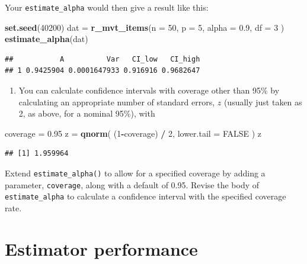 \documentclass[
]{book}
\newenvironment{Shaded}{\begin{snugshade}}{\end{snugshade}}
\newcommand{\AttributeTok}[1]{\textcolor[rgb]{0.13,0.29,0.53}{#1}}
\newcommand{\ConstantTok}[1]{\textcolor[rgb]{0.56,0.35,0.01}{#1}}
\newcommand{\DecValTok}[1]{\textcolor[rgb]{0.00,0.00,0.81}{#1}}
\newcommand{\FloatTok}[1]{\textcolor[rgb]{0.00,0.00,0.81}{#1}}
\newcommand{\FunctionTok}[1]{\textcolor[rgb]{0.13,0.29,0.53}{\textbf{#1}}}
\newcommand{\NormalTok}[1]{#1}
\newcommand{\OtherTok}[1]{\textcolor[rgb]{0.56,0.35,0.01}{#1}}
\newcommand{\SpecialCharTok}[1]{\textcolor[rgb]{0.81,0.36,0.00}{\textbf{#1}}}
\providecommand{\tightlist}{%
  \setlength{\itemsep}{0pt}\setlength{\parskip}{0pt}}
\begin{document}
Your \texttt{estimate\_alpha} would then give a result like this:

\begin{Shaded}
\begin{Highlighting}[]
\FunctionTok{set.seed}\NormalTok{(}\DecValTok{40200}\NormalTok{)}
\NormalTok{dat }\OtherTok{=} \FunctionTok{r\_mvt\_items}\NormalTok{(}\AttributeTok{n =} \DecValTok{50}\NormalTok{, }\AttributeTok{p =} \DecValTok{5}\NormalTok{, }\AttributeTok{alpha =} \FloatTok{0.9}\NormalTok{, }\AttributeTok{df =} \DecValTok{3}\NormalTok{ )}
\FunctionTok{estimate\_alpha}\NormalTok{(dat)}
\end{Highlighting}
\end{Shaded}

\begin{verbatim}
##           A          Var   CI_low   CI_high
## 1 0.9425904 0.0001647933 0.916916 0.9682647
\end{verbatim}

\begin{enumerate}
\def\labelenumi{\arabic{enumi}.}
\setcounter{enumi}{1}
\tightlist
\item
  You can calculate confidence intervals with coverage other than 95\% by calculating an appropriate number of standard errors, \(z\) (usually just taken as 2, as above, for a nominal 95\%), with
\end{enumerate}

\begin{Shaded}
\begin{Highlighting}[]
\NormalTok{coverage }\OtherTok{=} \FloatTok{0.95}
\NormalTok{z }\OtherTok{=} \FunctionTok{qnorm}\NormalTok{( (}\DecValTok{1}\SpecialCharTok{{-}}\NormalTok{coverage) }\SpecialCharTok{/} \DecValTok{2}\NormalTok{, }\AttributeTok{lower.tail =} \ConstantTok{FALSE}\NormalTok{ )}
\NormalTok{z}
\end{Highlighting}
\end{Shaded}

\begin{verbatim}
## [1] 1.959964
\end{verbatim}

Extend \texttt{estimate\_alpha()} to allow for a specified coverage by adding a parameter, \texttt{coverage}, along with a default of 0.95. Revise the body of \texttt{estimate\_alpha} to calculate a confidence interval with the specified coverage rate.

\section{Estimator performance}\label{estimator-performance}
\end{document}
